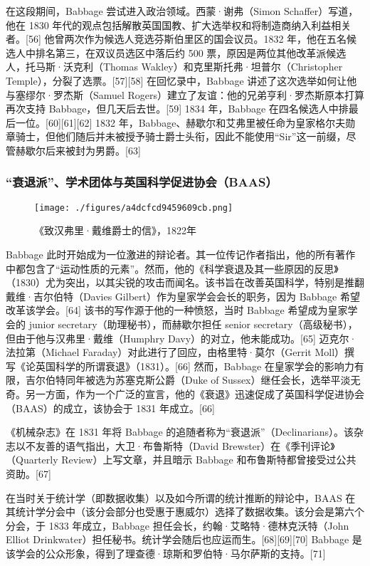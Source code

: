 在这段期间，Babbage 尝试进入政治领域。西蒙·谢弗（Simon Schaffer）写道，他在 1830 年代的观点包括解散英国国教、扩大选举权和将制造商纳入利益相关者。[56] 他曾两次作为候选人竞选芬斯伯里区的国会议员。1832 年，他在五名候选人中排名第三，在双议员选区中落后约 500 票，原因是两位其他改革派候选人，托马斯·沃克利（Thomas Wakley）和克里斯托弗·坦普尔（Christopher Temple），分裂了选票。[57][58] 在回忆录中，Babbage 讲述了这次选举如何让他与塞缪尔·罗杰斯（Samuel Rogers）建立了友谊：他的兄弟亨利·罗杰斯原本打算再次支持 Babbage，但几天后去世。[59] 1834 年，Babbage 在四名候选人中排最后一位。[60][61][62] 1832 年，Babbage、赫歇尔和艾弗里被任命为皇家格尔夫勋章骑士，但他们随后并未被授予骑士爵士头衔，因此不能使用“Sir”这一前缀，尽管赫歇尔后来被封为男爵。[63]
\subsubsection{“衰退派”、学术团体与英国科学促进协会（BAAS）}
\begin{figure}[ht]
\centering
\texttt{[image: ./figures/a4dcfcd9459609cb.png]}
\caption{《致汉弗里·戴维爵士的信》，1822年} \label{fig_CRSBQ_6}
\end{figure}
Babbage 此时开始成为一位激进的辩论者。其一位传记作者指出，他的所有著作中都包含了“运动性质的元素”。然而，他的《科学衰退及其一些原因的反思》（1830）尤为突出，以其尖锐的攻击而闻名。该书旨在改善英国科学，特别是推翻戴维·吉尔伯特（Davies Gilbert）作为皇家学会会长的职务，因为 Babbage 希望改革该学会。[64] 该书的写作源于他的一种愤怒，当时 Babbage 希望成为皇家学会的 junior secretary（助理秘书），而赫歇尔担任 senior secretary（高级秘书），但由于他与汉弗里·戴维（Humphry Davy）的对立，他未能成功。[65] 迈克尔·法拉第（Michael Faraday）对此进行了回应，由格里特·莫尔（Gerrit Moll）撰写《论英国科学的所谓衰退》（1831）。[66] 然而，Babbage 在皇家学会的影响力有限，吉尔伯特同年被选为苏塞克斯公爵（Duke of Sussex）继任会长，选举平淡无奇。另一方面，作为一个广泛的宣言，他的《衰退》迅速促成了英国科学促进协会（BAAS）的成立，该协会于 1831 年成立。[66]

《机械杂志》在 1831 年将 Babbage 的追随者称为“衰退派”（Declinarians）。该杂志以不友善的语气指出，大卫·布鲁斯特（David Brewster）在《季刊评论》（Quarterly Review）上写文章，并且暗示 Babbage 和布鲁斯特都曾接受过公共资助。[67]

在当时关于统计学（即数据收集）以及如今所谓的统计推断的辩论中，BAAS 在其统计学分会中（该分会部分也受惠于惠威尔）选择了数据收集。该分会是第六个分会，于 1833 年成立，Babbage 担任会长，约翰·艾略特·德林克沃特（John Elliot Drinkwater）担任秘书。统计学会随后也应运而生。[68][69][70] Babbage 是该学会的公众形象，得到了理查德·琼斯和罗伯特·马尔萨斯的支持。[71]
